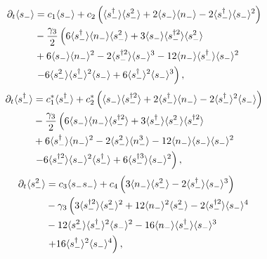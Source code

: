 \begin{align}%
%
%
\partial_t\langle s_- \rangle &= c_1 \langle s_- \rangle + c_2 \left(\langle s_-^\dagger \rangle \langle s_-^2 \rangle + 2 \langle s_- \rangle \langle n_-\rangle - 2 \langle s_-^\dagger \rangle \langle s_- \rangle^2\right) \notag \\
%
&-\frac{\gamma_3}{2}\left(
6 \langle s_-^\dagger \rangle \langle n_- \rangle \langle s_-^2\rangle + 3 \langle s_- \rangle \langle s_-^{\dagger 2} \rangle \langle s_-^2 \rangle \right. \notag \\
%
&+ 6 \langle s_- \rangle \langle n_- \rangle^2 - 2 \langle s_-^{\dagger 2} \rangle \langle s_- \rangle^3 - 12 \langle n_- \rangle \langle s_-^\dagger \rangle \langle s_- \rangle^2 \notag \\
%
&\left. - 6 \langle s_-^2 \rangle \langle s_-^\dagger \rangle^2 \langle s_- \rangle + 6 \langle s_-^\dagger \rangle^2 \langle s_- \rangle^3\right), \notag
\end{align}
\begin{align}
%
%
\partial_t\langle s_-^\dagger \rangle &= c_1^* \langle s_-^\dagger \rangle + c_2^* \left(\langle s_- \rangle \langle s_-^{\dagger 2} \rangle + 2 \langle s_-^\dagger \rangle \langle n_- \rangle - 2 \langle s_-^\dagger \rangle^2\langle s_- \rangle \right) \notag \\
%
&-\frac{\gamma_3}{2}\left(6 \langle s_- \rangle \langle n_- \rangle \langle s_-^{\dagger 2}\rangle + 3 \langle s_-^\dagger \rangle \langle s_-^2 \rangle \langle s_-^{\dagger 2}\rangle \notag \right. \notag \\
%
&+ 6 \langle s_-^\dagger \rangle \langle n_-\rangle^2 - 2 \langle s_-^2 \rangle \langle n_-^3\rangle - 12 \langle n_- \rangle \langle s_- \rangle \langle s_- \rangle^2 \notag \\
%
&\left. - 6 \langle s_-^{\dagger 2} \rangle \langle s_- \rangle^2 \langle s_-^\dagger \rangle + 6 \langle s_-^{\dagger 3} \rangle \langle s_- \rangle^2 \right), \notag
\end{align}
\begin{align}
%
%
\partial_t\langle s_-^2 \rangle &= c_3 \langle s_- s_- \rangle + c_4 \left( 3 \langle n_- \rangle \langle s_-^2 \rangle  - 2 \langle s_-^\dagger \rangle \langle s_- \rangle^3 \right) \notag \\
%
&- \gamma_3 \left( 3 \langle s_-^{\dagger 2}\rangle \langle s_-^2\rangle^2 + 12 \langle n_- \rangle^2 \langle s_-^2\rangle - 2 \langle s_-^{\dagger 2}\rangle \langle s_- \rangle^4 \right. \notag \\
%
& - 12 \langle s_-^2 \rangle \langle s_-^{\dagger}\rangle^2 \langle s_- \rangle^2 - 16 \langle n_- \rangle \langle s_-^\dagger \rangle \langle s_- \rangle^3 \notag \\
%
&\left. + 16 \langle s_-^\dagger \rangle^2 \langle s_- \rangle^4 \right),\notag
\end{align}
